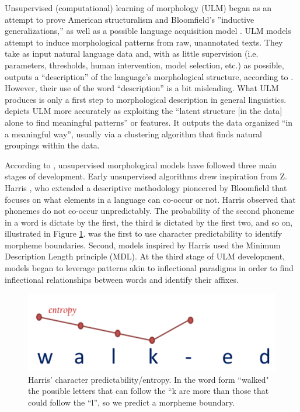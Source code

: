 \documentclass[12pt]{article}
\begin{document}
Unsupervised (computational) learning of morphology (ULM) began as an attempt to prove American structuralism and Bloomfield's ''inductive generalizations,'' as well as a possible language acquisition model \cite{hammarstrom_unsupervised_2011}. ULM models attempt to induce morphological patterns from raw, unannotated texts. They take as input natural language data and, with as little supervision (i.e. parameters, thresholds, human intervention, model selection, etc.) as possible, outputs a ``description'' of the language’s morphological structure, according to . However, their use of the word “description” is a bit misleading. What ULM produces is only a first step to morphological description in general linguistics.  depicts ULM more accurately as exploiting the ``latent structure [in the data] alone to find meaningful patterns'' or features. It outputs the data organized ``in a meaningful way'', usually via a clustering algorithm that finds natural groupings within the data. 

According to , unsupervised morphological models have followed three main stages of development. Early unsupervised algorithms drew inspiration from Z. Harris \cite{harris_phoneme_1955,harris_morpheme_1967}, who extended a descriptive methodology pioneered by Bloomfield that focuses on what elements in a language can co-occur or not. Harris observed that phonemes do not co-occur unpredictably. The probability of the second phoneme in a word is dictate by the first, the third is dictated by the first two, and so on, illustrated in Figure \ref{fig:harris}.  was the first to use character predictability to identify morpheme boundaries. Second, models inspired by Harris used the Minimum Description Length principle (MDL). At the third stage of ULM development, models began to leverage patterns akin to inflectional paradigms in order to find inflectional relationships between words and identify their affixes.

\begin{figure}[ht]
\label{fig:harris}
\begin{center}
\includegraphics[width=0.5\columnwidth]{Harris-Entropy-image.PNG}
\caption{Harris' character predictability/entropy. In the word form ``walked" the possible letters that can follow the ``k are more than those that could follow the ``l'', so we predict a morpheme boundary.}
\end{center}
\end{figure}
\end{document}
